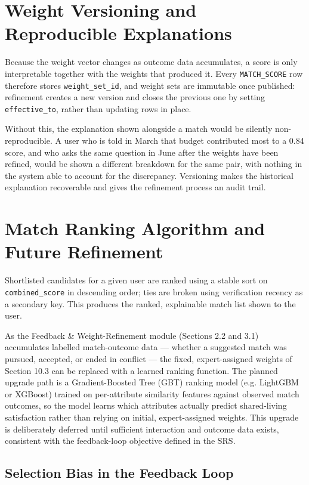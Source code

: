 \documentclass[12pt,a4paper]{report}
\begin{document}
\section{Weight Versioning and Reproducible Explanations}

Because the weight vector changes as outcome data accumulates, a score is only interpretable together with the weights that produced it. Every \texttt{MATCH\_SCORE} row therefore stores \texttt{weight\_set\_id}, and weight sets are immutable once published: refinement creates a new version and closes the previous one by setting \texttt{effective\_to}, rather than updating rows in place.

Without this, the explanation shown alongside a match would be silently non-reproducible. A user who is told in March that budget contributed most to a 0.84 score, and who asks the same question in June after the weights have been refined, would be shown a different breakdown for the same pair, with nothing in the system able to account for the discrepancy. Versioning makes the historical explanation recoverable and gives the refinement process an audit trail.

\section{Match Ranking Algorithm and Future Refinement}

Shortlisted candidates for a given user are ranked using a stable sort on \texttt{combined\_score} in descending order; ties are broken using verification recency as a secondary key. This produces the ranked, explainable match list shown to the user.

As the Feedback \& Weight-Refinement module (Sections 2.2 and 3.1) accumulates labelled match-outcome data --- whether a suggested match was pursued, accepted, or ended in conflict --- the fixed, expert-assigned weights of Section 10.3 can be replaced with a learned ranking function. The planned upgrade path is a Gradient-Boosted Tree (GBT) ranking model (e.g. LightGBM or XGBoost) trained on per-attribute similarity features against observed match outcomes, so the model learns which attributes actually predict shared-living satisfaction rather than relying on initial, expert-assigned weights. This upgrade is deliberately deferred until sufficient interaction and outcome data exists, consistent with the feedback-loop objective defined in the SRS.

\subsection*{Selection Bias in the Feedback Loop}
\end{document}
